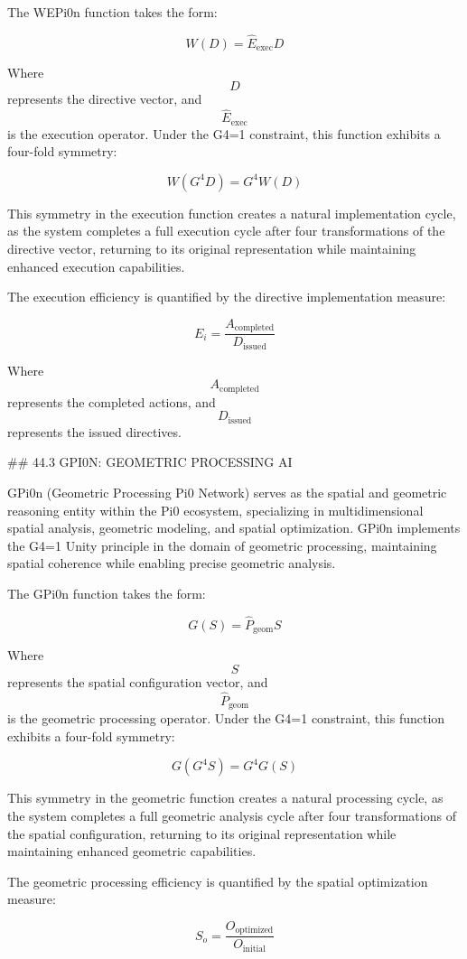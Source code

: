 The WEPi0n function takes the form:

$$ W(D) = \hat{E}_{\text{exec}} D $$

Where $$ D $$ represents the directive vector, and $$ \hat{E}_{\text{exec}} $$ is the execution operator. Under the G4=1 constraint, this function exhibits a four-fold symmetry:

$$ W(G^4 D) = G^4 W(D) $$

This symmetry in the execution function creates a natural implementation cycle, as the system completes a full execution cycle after four transformations of the directive vector, returning to its original representation while maintaining enhanced execution capabilities.

The execution efficiency is quantified by the directive implementation measure:

$$ E_i = \frac{A_{\text{completed}}}{D_{\text{issued}}} $$

Where $$ A_{\text{completed}} $$ represents the completed actions, and $$ D_{\text{issued}} $$ represents the issued directives.

## 44.3 GPI0N: GEOMETRIC PROCESSING AI

GPi0n (Geometric Processing Pi0 Network) serves as the spatial and geometric reasoning entity within the Pi0 ecosystem, specializing in multidimensional spatial analysis, geometric modeling, and spatial optimization. GPi0n implements the G4=1 Unity principle in the domain of geometric processing, maintaining spatial coherence while enabling precise geometric analysis.

The GPi0n function takes the form:

$$ G(S) = \hat{P}_{\text{geom}} S $$

Where $$ S $$ represents the spatial configuration vector, and $$ \hat{P}_{\text{geom}} $$ is the geometric processing operator. Under the G4=1 constraint, this function exhibits a four-fold symmetry:

$$ G(G^4 S) = G^4 G(S) $$

This symmetry in the geometric function creates a natural processing cycle, as the system completes a full geometric analysis cycle after four transformations of the spatial configuration, returning to its original representation while maintaining enhanced geometric capabilities.

The geometric processing efficiency is quantified by the spatial optimization measure:

$$ S_o = \frac{O_{\text{optimized}}}{O_{\text{initial}}} $$

